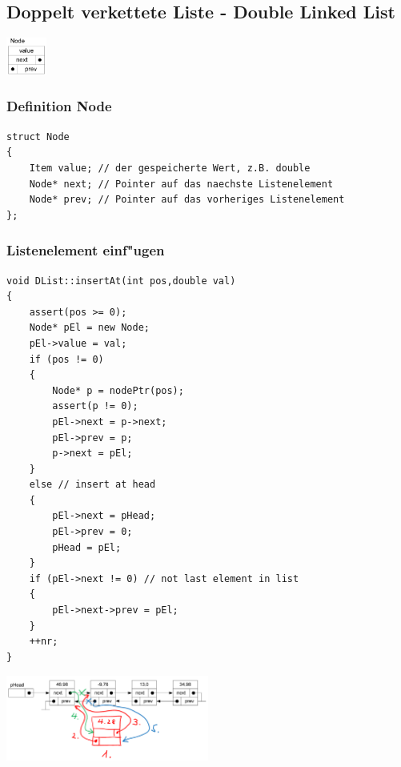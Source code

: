 \subsection{Doppelt verkettete Liste - Double Linked List}
\begin{flushleft}
{\includegraphics[width=0.1\textwidth]{images/Listen/DLL.png}}
\label{Fig: Double Linked List}
\end{flushleft}
\subsubsection{Definition Node}
\begin{lstlisting}[style=C]
struct Node
{
	Item value; // der gespeicherte Wert, z.B. double
	Node* next; // Pointer auf das naechste Listenelement
	Node* prev; // Pointer auf das vorheriges Listenelement
};
\end{lstlisting}

\subsubsection{Listenelement einf"ugen}
\begin{lstlisting}[style=C]
void DList::insertAt(int pos,double val)
{
	assert(pos >= 0);
	Node* pEl = new Node;
	pEl->value = val;
	if (pos != 0)
	{
		Node* p = nodePtr(pos);
		assert(p != 0);
		pEl->next = p->next;
		pEl->prev = p;
		p->next = pEl;
	}
	else // insert at head
	{
		pEl->next = pHead;
		pEl->prev = 0;
		pHead = pEl;
	}
	if (pEl->next != 0) // not last element in list
	{
		pEl->next->prev = pEl;
	}
	++nr;
}
\end{lstlisting}
\begin{flushleft}
{\includegraphics[width=0.5\textwidth]{images/Listen/DLL_Insert.png}}
\label{Fig: Element bei DLL einf"ugen}
\end{flushleft}

